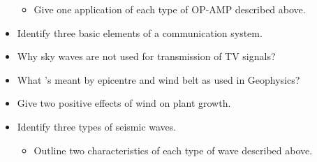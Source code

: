\documentclass{article}
\begin{document}
\begin{itemize}
\begin{itemize}
\item Give one application of each type of OP-AMP described above.
\end{itemize}
\item Identify three basic elements of a communication system. 
\item Why sky waves are not used for transmission of TV signals? 
\item What 's meant by epicentre and wind belt as used in Geophysics? 
\item Give two positive effects of wind on plant growth.
\item Identify three types of seismic waves.
 \begin{itemize}
\item Outline two characteristics of each type of wave described above.
\end{itemize}
\end{itemize}
\end{document}
